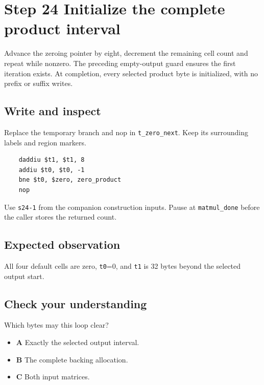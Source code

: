 \section{Step 24 Initialize the complete product interval}\label{matmul-s24}

Advance the zeroing pointer by eight, decrement the remaining cell count and repeat while nonzero. The preceding empty-output guard ensures the first iteration exists. At completion, every selected product byte is initialized, with no prefix or suffix writes.

\subsection{Write and inspect}
Replace the temporary branch and nop in \texttt{t\_zero\_next}. Keep its surrounding labels and region markers.

\begin{verbatim}
    daddiu $t1, $t1, 8
    addiu $t0, $t0, -1
    bne $t0, $zero, zero_product
    nop
\end{verbatim}
Use \texttt{s24-1} from the companion construction inputs. Pause at \texttt{matmul\_done} before the caller stores the returned count.

\subsection{Expected observation}
All four default cells are zero, \texttt{t0}=0, and \texttt{t1} is 32 bytes beyond the selected output start.

\subsection{Check your understanding}
Which bytes may this loop clear?

\begin{itemize}
  \item \textbf{A} Exactly the selected output interval.
  \item \textbf{B} The complete backing allocation.
  \item \textbf{C} Both input matrices.
\end{itemize}
